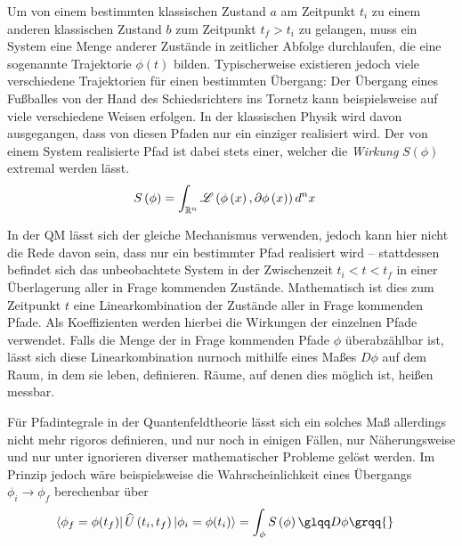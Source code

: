 Um von einem bestimmten klassischen Zustand $a$ am Zeitpunkt $t_i$ zu
einem anderen klassischen Zustand $b$ zum Zeitpunkt $t_f > t_i$ zu
gelangen, muss ein System eine Menge anderer Zustände in zeitlicher
Abfolge durchlaufen, die eine sogenannte Trajektorie $\phi(t)$
bilden. Typischerweise existieren jedoch viele verschiedene
Trajektorien für einen bestimmten Übergang: Der Übergang eines
Fußballes von der Hand des Schiedsrichters ins Tornetz kann
beispielsweise auf viele verschiedene Weisen erfolgen. In der
klassischen Physik wird davon ausgegangen, dass von diesen Pfaden nur
ein einziger realisiert wird. Der von einem System realisierte Pfad
ist dabei stets einer, welcher die \textit{Wirkung} $S(\phi)$ extremal
werden lässt. 
\begin{align}
  S\left(\phi\right) &= \int_{\mathbb{R}^n} \mathscr{L}\left(\phi\left(x\right),\partial \phi\left(x\right) \right) d^nx
\end{align}

In der QM lässt sich der gleiche Mechanismus verwenden, jedoch kann
hier nicht die Rede davon sein, dass nur ein bestimmter Pfad
realisiert wird -- stattdessen befindet sich das unbeobachtete System
in der Zwischenzeit $t_i < t < t_f$ in einer Überlagerung aller in
Frage kommenden Zustände. Mathematisch ist dies zum Zeitpunkt $t$ eine
Linearkombination der Zustände aller in Frage kommenden Pfade. Als
Koeffizienten werden hierbei die Wirkungen der einzelnen Pfade
verwendet. Falls die Menge der in Frage kommenden Pfade $\phi$
überabzählbar ist, lässt sich diese Linearkombination nurnoch mithilfe
eines Maßes $D\phi${} auf dem Raum, in dem sie leben,
definieren. Räume, auf denen dies möglich ist, heißen messbar.

Für Pfadintegrale in der Quantenfeldtheorie lässt sich ein solches Maß
allerdings nicht mehr rigoros definieren, und nur noch in einigen
Fällen, nur Näherungsweise und nur unter ignorieren diverser
mathematischer Probleme gelöst werden. Im Prinzip jedoch wäre
beispielsweise die Wahrscheinlichkeit eines Übergangs
$\phi_i\to\phi_f$ berechenbar über
\begin{align*}
 \bra{\phi_f=\phi(t_f)}
   \widehat{U}\left(t_i,t_f\right)
 \ket{\phi_i=\phi(t_i)}
  &= \int_{\phi} S\left(\phi\right) \glqq D\phi\grqq{}
\end{align*}
